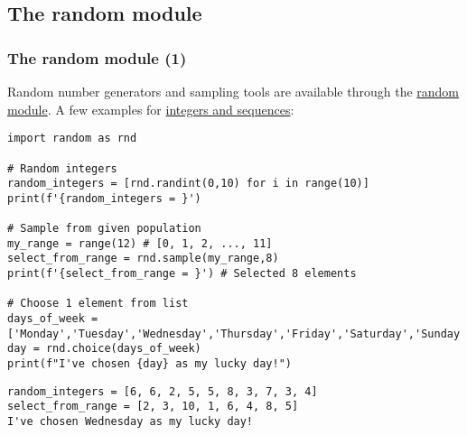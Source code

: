 

\subsection{The random module}
\begin{frame}[fragile]
  \frametitle{The random module (1)}
  Random number generators and sampling tools are available through the \href{https://docs.python.org/3/library/random.html}{random module}. A few examples for \href{https://docs.python.org/3/library/random.html#functions-for-integers}{integers and sequences}:
  \begin{lstlisting}
import random as rnd

# Random integers
random_integers = [rnd.randint(0,10) for i in range(10)]
print(f'{random_integers = }')

# Sample from given population
my_range = range(12) # [0, 1, 2, ..., 11]
select_from_range = rnd.sample(my_range,8)
print(f'{select_from_range = }') # Selected 8 elements

# Choose 1 element from list
days_of_week = ['Monday','Tuesday','Wednesday','Thursday','Friday','Saturday','Sunday']
day = rnd.choice(days_of_week)
print(f"I've chosen {day} as my lucky day!")
  \end{lstlisting}\pause

  \begin{lstlisting}[style=PyOutput]
random_integers = [6, 6, 2, 5, 5, 8, 3, 7, 3, 4]
select_from_range = [2, 3, 10, 1, 6, 4, 8, 5]
I've chosen Wednesday as my lucky day!
  \end{lstlisting}
\end{frame}


